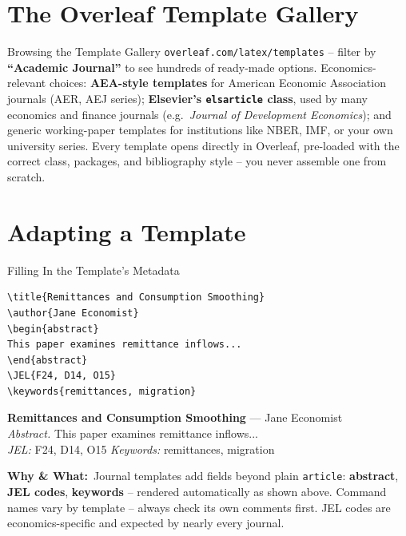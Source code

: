 \documentclass[11pt,aspectratio=169,table]{beamer}
\newcommand{\whybox}[1]{%
  \vspace{2pt}
  {\scriptsize\raggedright\textcolor{red!55!black}{\textbf{Why \& What:}}~#1\par}
}
\begin{document}
\section{The Overleaf Template Gallery}

\begin{frame}{Browsing the Template Gallery}
  \small
  \texttt{overleaf.com/latex/templates} -- filter by \textbf{``Academic
  Journal''} to see hundreds of ready-made options. Economics-relevant
  choices: \textbf{AEA-style templates} for American Economic
  Association journals (AER, AEJ series); \textbf{Elsevier's
  \texttt{elsarticle} class}, used by many economics and finance
  journals (e.g.\ \emph{Journal of Development Economics}); and
  generic working-paper templates for institutions like NBER, IMF, or
  your own university series. Every template opens directly in
  Overleaf, pre-loaded with the correct class, packages, and
  bibliography style -- you never assemble one from scratch.
\end{frame}

\section{Adapting a Template}

\begin{frame}[fragile]{Filling In the Template's Metadata}
  \begin{lstlisting}
\title{Remittances and Consumption Smoothing}
\author{Jane Economist}
\begin{abstract}
This paper examines remittance inflows...
\end{abstract}
\JEL{F24, D14, O15}
\keywords{remittances, migration}
  \end{lstlisting}
  \begin{outputbox}
    \scriptsize
    \textbf{Remittances and Consumption Smoothing} --- Jane Economist\\[3pt]
    \textit{Abstract.} This paper examines remittance inflows...\\[3pt]
    \textit{JEL:} F24, D14, O15 \quad \textit{Keywords:} remittances, migration
  \end{outputbox}
  \whybox{Journal templates add fields beyond plain \texttt{article}:
  \textbf{abstract}, \textbf{JEL codes}, \textbf{keywords} -- rendered
  automatically as shown above. Command names vary by template --
  always check its own comments first. JEL codes are
  economics-specific and expected by nearly every journal.}
\end{frame}
\end{document}

